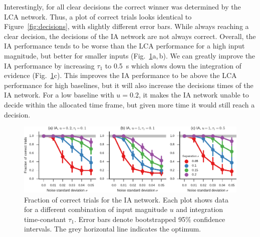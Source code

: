 \documentclass[10pt,letterpaper]{article}
\begin{document}
Interestingly, for all clear decisions the correct winner was determined by the LCA network.
Thus, a plot of correct trials looks identical to Figure~\ref{fig:decisions}, with slightly different error bars.
While always reaching a clear decision, the decisions of the IA network are not always correct.
Overall, the IA performance tends to be worse than the LCA performance for a high input magnitude, but better for smaller inputs (Fig.~\ref{fig:correct}a,\,b).
We can greatly improve the IA performance by increasing $\tau_1$ to \SI{0.5}{\second} which slows down the integration of evidence (Fig.~\ref{fig:correct}c).
This improves the IA performance to be above the LCA performance for high baselines, but it will also increase the decisions times of the IA network.
For a low baseline with $u=0.2$, it makes the IA network unable to decide within the allocated time frame, but given more time it would still reach a decision.
\begin{figure}[t]
    \centering
    \includegraphics{figures/correct}
    \caption{
        Fraction of correct trials for the IA network.
        Each plot shows data for a different combination of input magnitude $u$ and integration time-constant $\tau_1$.
        Error bars denote bootstrapped 95\% confidence intervals.
        The grey horizontal line indicates the optimum.
    }\label{fig:correct}
\end{figure}
\end{document}
